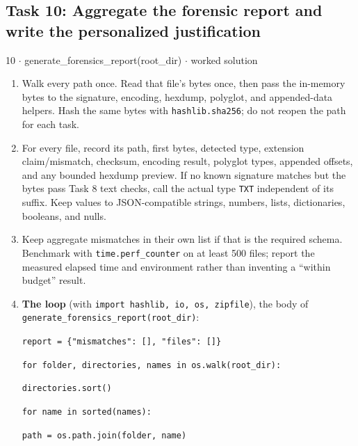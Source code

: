 \documentclass[11pt]{article}
\begin{document}
\begin{keepsection}\subsection{Task 10: Aggregate the forensic report and write the personalized justification}

\begin{workedbox}{10 \ensuremath{\cdot} generate\_forensics\_report(root\_dir) \ensuremath{\cdot} worked solution}
\begin{enumerate}
\item Walk every path once. Read that file’s bytes once, then pass the in-memory bytes to the signature, encoding, hexdump, polyglot, and appended-data helpers. Hash the same bytes with \texttt{hashlib.sha256}; do not reopen the path for each task.
\item For every file, record its path, first bytes, detected type, extension claim/mismatch, checksum, encoding result, polyglot types, appended offsets, and any bounded hexdump preview. If no known signature matches but the bytes pass Task 8 text checks, call the actual type \texttt{TXT} independent of its suffix. Keep values to JSON-compatible strings, numbers, lists, dictionaries, booleans, and nulls.
\item Keep aggregate mismatches in their own list if that is the required schema. Benchmark with \texttt{time.perf\_counter} on at least 500 files; report the measured elapsed time and environment rather than inventing a “within budget” result.
\item {}
\textbf{The loop} (with \texttt{import hashlib, io, os, zipfile}), the body of \texttt{generate\_forensics\_report(root\_dir)}:
\begin{tcolorbox}[colback=Paperblue,colframe=Paperblue,boxrule=0pt,arc=0pt,left=7pt,right=7pt,top=5pt,bottom=5pt]\small\sloppy
\noindent\hspace*{0em}\texttt{report = \{"mismatches": [], "files": []\}}\par
\noindent\hspace*{0em}\texttt{for folder, directories, names in os.walk(root\_dir):}\par
\noindent\hspace*{1em}\texttt{directories.sort()}\par
\noindent\hspace*{1em}\texttt{for name in sorted(names):}\par
\noindent\hspace*{3em}\texttt{path = os.path.join(folder, name)}\par

\end{tcolorbox}
\end{enumerate}
\end{workedbox}
\end{keepsection}
\end{document}
